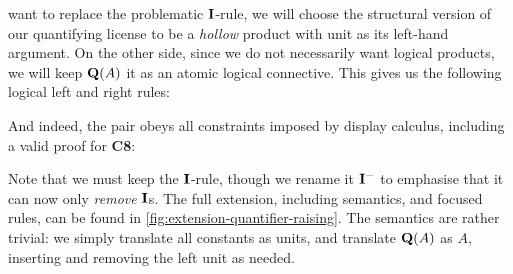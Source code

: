 want to replace the problematic $\I$-rule, we will choose the
structural version of our quantifying license to be a \emph{hollow}
product with unit as its left-hand argument.
On the other side, since we do not necessarily want logical products,
we will keep $\q[A]$ it as an atomic logical connective. This gives us
the following logical left and right rules:
\begin{center}
  \begin{pfbox}
  \end{pfbox}
  \begin{pfbox}
  \end{pfbox}
\end{center}
And indeed, the pair obeys all constraints imposed by display
calculus, including a valid proof for \textbf{C8}:
\begin{pfblock}
\end{pfblock}
Note that we must keep the $\I$-rule, though we rename it $\I^-$ to
emphasise that it can now only \emph{remove} $\I$s. The full
extension, including semantics, and focused rules, can be found in
\autoref{fig:extension-quantifier-raising}. The semantics are rather
trivial: we simply translate all constants as units, and translate
$\q[A]$ as $A$, inserting and removing the left unit as needed.



